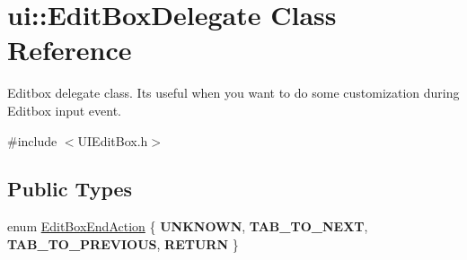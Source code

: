 \hypertarget{classui_1_1EditBoxDelegate}{}\section{ui\+:\+:Edit\+Box\+Delegate Class Reference}
\label{classui_1_1EditBoxDelegate}


Editbox delegate class. It\textquotesingle{}s useful when you want to do some customization during Editbox input event.  




{\ttfamily \#include $<$U\+I\+Edit\+Box.\+h$>$}

\subsection*{Public Types}
\begin{DoxyCompactItemize}
\item 
enum \hyperlink{classui_1_1EditBoxDelegate_ae7285a0cdbe2f2daf0557c97dba0bdb5}{Edit\+Box\+End\+Action} \{ {\bfseries U\+N\+K\+N\+O\+WN}, 
{\bfseries T\+A\+B\+\_\+\+T\+O\+\_\+\+N\+E\+XT}, 
{\bfseries T\+A\+B\+\_\+\+T\+O\+\_\+\+P\+R\+E\+V\+I\+O\+US}, 
{\bfseries R\+E\+T\+U\+RN}
 \}
\end{DoxyCompactItemize}
